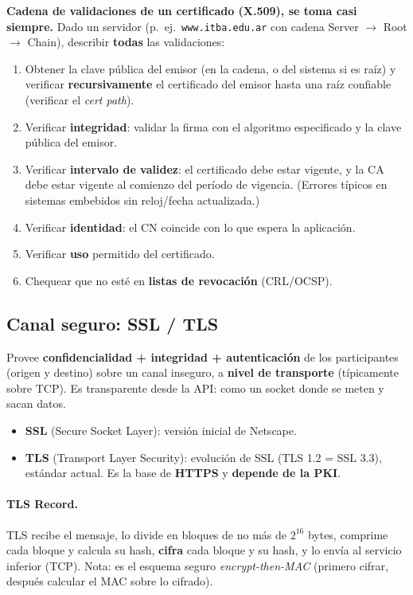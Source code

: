 \documentclass[../main.tex]{subfiles}
\begin{document}
\begin{examen}
\textbf{Cadena de validaciones de un certificado (X.509), se toma casi siempre.}
Dado un servidor (p.\ ej.\ \texttt{www.itba.edu.ar} con cadena Server $\to$ Root
$\to$ Chain), describir \textbf{todas} las validaciones:
\begin{enumerate}[leftmargin=1.5em]
  \item Obtener la clave pública del emisor (en la cadena, o del sistema si es raíz)
  y verificar \textbf{recursivamente} el certificado del emisor hasta una raíz
  confiable (verificar el \emph{cert path}).
  \item Verificar \textbf{integridad}: validar la firma con el algoritmo especificado
  y la clave pública del emisor.
  \item Verificar \textbf{intervalo de validez}: el certificado debe estar vigente, y
  la CA debe estar vigente al comienzo del período de vigencia. (Errores típicos en
  sistemas embebidos sin reloj/fecha actualizada.)
  \item Verificar \textbf{identidad}: el CN coincide con lo que espera la aplicación.
  \item Verificar \textbf{uso} permitido del certificado.
  \item Chequear que no esté en \textbf{listas de revocación} (CRL/OCSP).
\end{enumerate}
\end{examen}

\subsection{Canal seguro: SSL / TLS}

Provee \textbf{confidencialidad + integridad + autenticación} de los participantes
(origen y destino) sobre un canal inseguro, a \textbf{nivel de transporte}
(típicamente sobre TCP). Es transparente desde la API: como un socket donde se meten
y sacan datos.
\begin{itemize}[leftmargin=1.4em]
  \item \textbf{SSL} (Secure Socket Layer): versión inicial de Netscape.
  \item \textbf{TLS} (Transport Layer Security): evolución de SSL (TLS 1.2 = SSL 3.3),
  estándar actual. Es la base de \textbf{HTTPS} y \textbf{depende de la PKI}.
\end{itemize}

\paragraph{TLS Record.} TLS recibe el mensaje, lo divide en bloques de no más de
$2^{16}$ bytes, comprime cada bloque y calcula su hash, \textbf{cifra} cada bloque y
su hash, y lo envía al servicio inferior (TCP). Nota: es el esquema seguro
\emph{encrypt-then-MAC} (primero cifrar, después calcular el MAC sobre lo cifrado).
\end{document}
